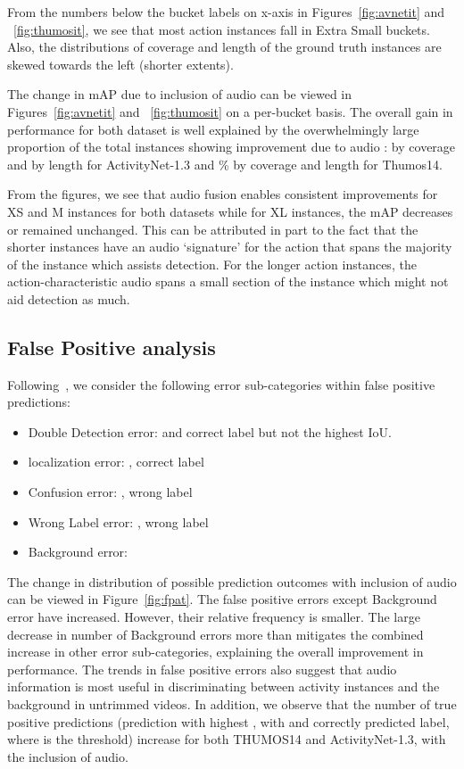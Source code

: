 \documentclass[10pt,twocolumn,letterpaper]{article}
\begin{document}
From the numbers below the bucket labels on x-axis in  Figures~\ref{fig:avnetit} and ~\ref{fig:thumosit}, we see that most action instances fall in Extra Small buckets. Also, the distributions of coverage and length of the ground truth instances are skewed towards the left (shorter extents).

The change in mAP due to inclusion of audio can be viewed in Figures~\ref{fig:avnetit} and ~\ref{fig:thumosit} on a per-bucket basis. The overall gain in performance for both dataset is well explained by the overwhelmingly large proportion of the total instances showing improvement due to audio :  by coverage and  by length for ActivityNet-1.3 and \% by coverage and length for Thumos14. 

From the figures, we see that audio fusion enables consistent improvements for XS and M instances for both datasets while for XL instances, the mAP decreases or remained unchanged. This can be attributed in part to the fact that the shorter instances have an audio `signature' for the action that spans the majority of the instance which assists detection. For the longer action instances, the action-characteristic audio spans a small section of the instance which might not aid detection as much. 



\subsection{False Positive analysis} 

Following~\cite{alwassel_2018_detad}, we consider the following error sub-categories within false positive predictions:
\begin{itemize}
    \item Double Detection error:  and correct label but not the highest IoU.
    \item localization error: , correct label
    \item Confusion error: , wrong label
    \item Wrong Label error: , wrong label
    \item Background error:  
\end{itemize}

The change in distribution of possible prediction outcomes with inclusion of audio can be viewed in Figure~\ref{fig:fpat}. The false positive errors except Background error have increased. However, their relative frequency is smaller. The large decrease in number of Background errors more than mitigates the combined increase in other error sub-categories, explaining the overall improvement in performance. The trends in false positive errors also suggest that audio information is most useful in discriminating between activity instances and the background in untrimmed videos. In addition, we observe that the number of true positive predictions  (prediction with highest , with  and correctly predicted label, where  is the  threshold) increase for both THUMOS14 and ActivityNet-1.3, with the inclusion of audio.
\end{document}
